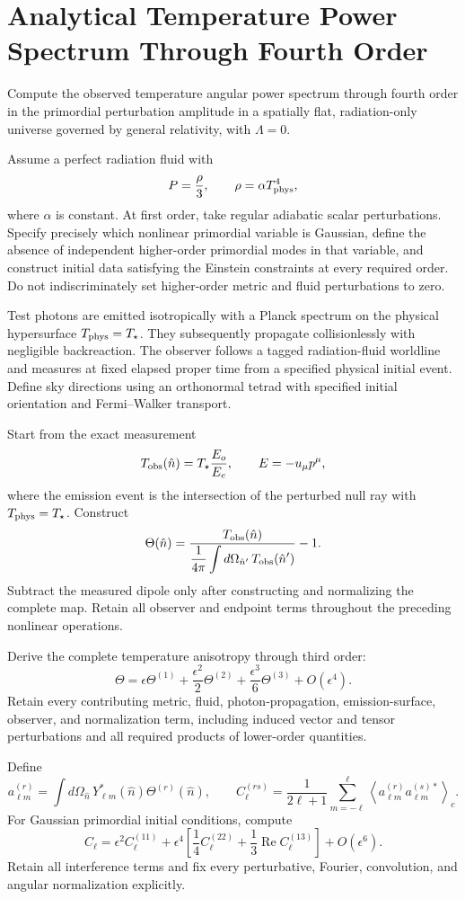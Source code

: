 \documentclass[11pt]{article}
\begin{document}
\section*{Analytical Temperature Power Spectrum Through Fourth Order}

Compute the observed temperature angular power spectrum through fourth
order in the primordial perturbation amplitude in a spatially flat,
radiation-only universe governed by general relativity, with
$\Lambda=0$.

Assume a perfect radiation fluid with
\[
P=\frac{\rho}{3},
\qquad
\rho=\alpha T_{\rm phys}^{4},
\]
where $\alpha$ is constant. At first order, take regular adiabatic scalar
perturbations. Specify precisely which nonlinear primordial variable is
Gaussian, define the absence of independent higher-order primordial
modes in that variable, and construct initial data satisfying the
Einstein constraints at every required order. Do not indiscriminately
set higher-order metric and fluid perturbations to zero.

Test photons are emitted isotropically with a Planck spectrum on the
physical hypersurface $T_{\rm phys}=T_\star$. They subsequently propagate
collisionlessly with negligible backreaction. The observer follows a
tagged radiation-fluid worldline and measures at fixed elapsed proper
time from a specified physical initial event. Define sky directions
using an orthonormal tetrad with specified initial orientation and
Fermi--Walker transport.

Start from the exact measurement
\[
T_{\rm obs}(\hat n)
=
T_\star\frac{E_o}{E_e},
\qquad
E=-u_\mu p^\mu,
\]
where the emission event is the intersection of the perturbed null ray
with $T_{\rm phys}=T_\star$. Construct
\[
\Theta(\hat n)
=
\frac{T_{\rm obs}(\hat n)}
{\displaystyle \frac{1}{4\pi}
 \int d\Omega_{\hat n'}\,T_{\rm obs}(\hat n')}
-1.
\]
Subtract the measured dipole only after constructing and normalizing
the complete map. Retain all observer and endpoint terms throughout
the preceding nonlinear operations.

Derive the complete temperature anisotropy through third order:
\[
\Theta
=
\epsilon\Theta^{(1)}
+\frac{\epsilon^2}{2}\Theta^{(2)}
+\frac{\epsilon^3}{6}\Theta^{(3)}
+O(\epsilon^4).
\]
Retain every contributing metric, fluid, photon-propagation,
emission-surface, observer, and normalization term, including induced
vector and tensor perturbations and all required products of
lower-order quantities.

Define
\[
a_{\ell m}^{(r)}
=
\int d\Omega_{\hat n}\,
Y_{\ell m}^{*}(\hat n)\Theta^{(r)}(\hat n),
\qquad
C_\ell^{(rs)}
=
\frac{1}{2\ell+1}
\sum_{m=-\ell}^{\ell}
\left\langle
a_{\ell m}^{(r)}a_{\ell m}^{(s)*}
\right\rangle_{\!c}.
\]
For Gaussian primordial initial conditions, compute
\[
C_\ell
=
\epsilon^2 C_\ell^{(11)}
+
\epsilon^4
\left[
\frac14 C_\ell^{(22)}
+
\frac13\operatorname{Re}C_\ell^{(13)}
\right]
+
O(\epsilon^6).
\]
Retain all interference terms and fix every perturbative, Fourier,
convolution, and angular normalization explicitly.
\end{document}
